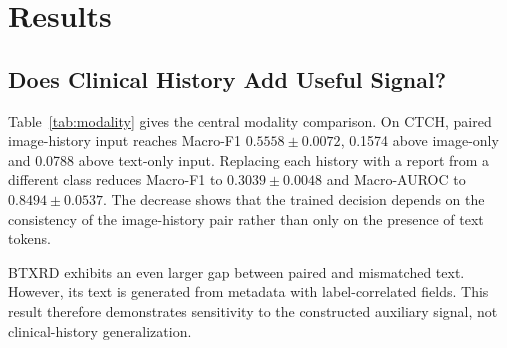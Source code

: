 \documentclass[runningheads]{llncs}
\begin{document}
\section{Results}

\subsection{Does Clinical History Add Useful Signal?}

Table~\ref{tab:modality} gives the central modality comparison. On CTCH, paired image-history input reaches Macro-F1 $0.5558\pm0.0072$, 0.1574 above image-only and 0.0788 above text-only input. Replacing each history with a report from a different class reduces Macro-F1 to $0.3039\pm0.0048$ and Macro-AUROC to $0.8494\pm0.0537$. The decrease shows that the trained decision depends on the consistency of the image-history pair rather than only on the presence of text tokens.

BTXRD exhibits an even larger gap between paired and mismatched text. However, its text is generated from metadata with label-correlated fields. This result therefore demonstrates sensitivity to the constructed auxiliary signal, not clinical-history generalization.

\begin{table}[t]
\caption{Input modality controls. Best values within each dataset are bold.}
\label{tab:modality}
\centering
\scriptsize
\setlength{\tabcolsep}{3.2pt}
\end{table}
\end{document}

